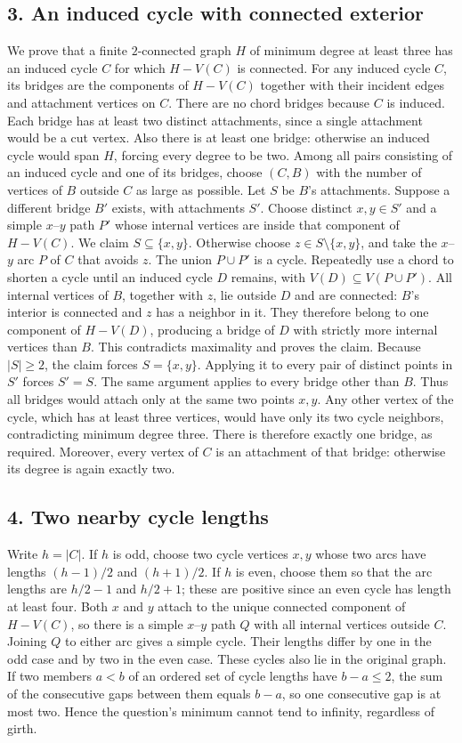 \subsection*{3. An induced cycle with connected exterior}
We prove that a finite $2$-connected graph $H$ of minimum degree at least three has an induced cycle $C$ for which $H-V(C)$ is connected.
For any induced cycle $C$, its bridges are the components of $H-V(C)$ together with their incident edges and attachment vertices on $C$. There are no chord bridges because $C$ is induced. Each bridge has at least two distinct attachments, since a single attachment would be a cut vertex. Also there is at least one bridge: otherwise an induced cycle would span $H$, forcing every degree to be two.
Among all pairs consisting of an induced cycle and one of its bridges, choose $(C,B)$ with the number of vertices of $B$ outside $C$ as large as possible. Let $S$ be $B$'s attachments. Suppose a different bridge $B'$ exists, with attachments $S'$. Choose distinct $x,y\in S'$ and a simple $x$--$y$ path $P'$ whose internal vertices are inside that component of $H-V(C)$.
We claim $S\subseteq\{x,y\}$. Otherwise choose $z\in S\setminus\{x,y\}$, and take the $x$--$y$ arc $P$ of $C$ that avoids $z$. The union $P\cup P'$ is a cycle. Repeatedly use a chord to shorten a cycle until an induced cycle $D$ remains, with $V(D)\subseteq V(P\cup P')$. All internal vertices of $B$, together with $z$, lie outside $D$ and are connected: $B$'s interior is connected and $z$ has a neighbor in it. They therefore belong to one component of $H-V(D)$, producing a bridge of $D$ with strictly more internal vertices than $B$. This contradicts maximality and proves the claim.
Because $|S|\ge2$, the claim forces $S=\{x,y\}$. Applying it to every pair of distinct points in $S'$ forces $S'=S$. The same argument applies to every bridge other than $B$. Thus all bridges would attach only at the same two points $x,y$. Any other vertex of the cycle, which has at least three vertices, would have only its two cycle neighbors, contradicting minimum degree three. There is therefore exactly one bridge, as required.
Moreover, every vertex of $C$ is an attachment of that bridge: otherwise its degree is again exactly two.
\subsection*{4. Two nearby cycle lengths}
Write $h=|C|$. If $h$ is odd, choose two cycle vertices $x,y$ whose two arcs have lengths $(h-1)/2$ and $(h+1)/2$. If $h$ is even, choose them so that the arc lengths are $h/2-1$ and $h/2+1$; these are positive since an even cycle has length at least four.
Both $x$ and $y$ attach to the unique connected component of $H-V(C)$, so there is a simple $x$--$y$ path $Q$ with all internal vertices outside $C$. Joining $Q$ to either arc gives a simple cycle. Their lengths differ by one in the odd case and by two in the even case. These cycles also lie in the original graph.
If two members $a<b$ of an ordered set of cycle lengths have $b-a\le2$, the sum of the consecutive gaps between them equals $b-a$, so one consecutive gap is at most two. Hence the question's minimum cannot tend to infinity, regardless of girth.
